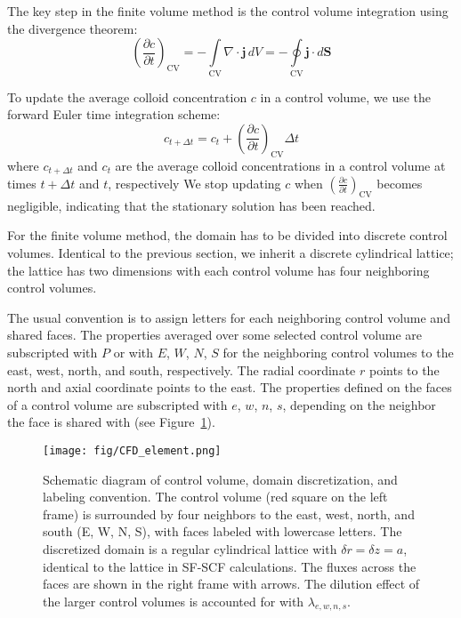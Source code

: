 \documentclass[10pt, a4paper]{article}
\begin{document}
\begin{multicols}{2}
The key step in the finite volume method is the control volume integration using the divergence theorem:
\begin{equation}
    \label{eq:CFD_integration_1}
    \left( \frac{\partial c}{\partial t} \right)_{\text{CV}} = -\int\limits_{\text{CV}} \nabla \cdot \mathbf{j} \, dV = -\oint\limits_{\text{CV}} \mathbf{j} \cdot d\mathbf{S}
\end{equation}

To update the average colloid concentration $c$ in a control volume, we use the forward Euler time integration scheme:
\begin{equation}
    c_{t + \Delta t} = c_t + \left( \frac{\partial c}{\partial t} \right)_{\text{CV}} \Delta t
\end{equation}
where $c_{t + \Delta t}$ and $c_t$ are the average colloid concentrations in a control volume at times $t + \Delta t$ and $t$, respectively
We stop updating $c$ when $\left( \frac{\partial c}{\partial t} \right)_{\text{CV}}$ becomes negligible, indicating that the stationary solution has been reached.

For the finite volume method, the domain has to be divided into discrete control volumes.
Identical to the previous section, we inherit a discrete cylindrical lattice; the lattice has two dimensions with each control volume has four neighboring control volumes.

The usual convention is to assign letters for each neighboring control volume and shared faces.
The properties averaged over some selected control volume are subscripted with $P$ or with $E$, $W$, $N$, $S$ for the neighboring control volumes to the east, west, north, and south, respectively.
The radial coordinate $r$ points to the north and axial coordinate points to the east.
The properties defined on the faces of a control volume are subscripted with $e$, $w$, $n$, $s$, depending on the neighbor the face is shared with (see Figure~\ref{fig:CFD_element}).


\begin{figure}[H]
    \centering
    \texttt{[image: fig/CFD\_element.png]}
    \caption{
        Schematic diagram of control volume, domain discretization, and labeling convention.
        The control volume (red square on the left frame) is surrounded by four neighbors to the east, west, north, and south (E, W, N, S), with faces labeled with lowercase letters.
        The discretized domain is a regular cylindrical lattice with $\delta r = \delta z = a$, identical to the lattice in SF-SCF calculations.
        The fluxes across the faces are shown in the right frame with arrows.
        The dilution effect of the larger control volumes is accounted for with $\lambda_{e,w,n,s}$.
        }
    \label{fig:CFD_element}
\end{figure}


\end{multicols}
\end{document}
